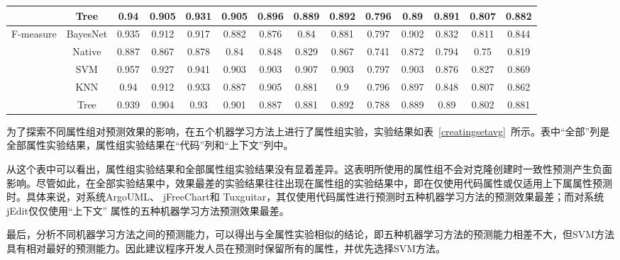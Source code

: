 \begin{sidewaystable} [htbp]
\begin{tabular}{cccccccccccccc}
&Tree&	0.94&	0.905&	0.931&		0.905&	0.896&	0.889&		0.892&	0.796&	0.89&		0.891&	0.807&	0.882\\
\hline
\multirow{5}{*}{F-measure}
&BayesNet&	0.935&	0.912&	0.917&		0.882&	0.876&	0.84&		0.881&	0.797&	0.902&		0.832&	0.811&	0.844\\
&Native&	0.887&	0.867&	0.878&		0.84&	0.848&	0.829&		0.867&	0.741&	0.872&		0.794&	0.75&	0.819\\
&SVM&	0.957&	0.927&	0.941&		0.903&	0.903&	0.907&		0.903&	0.797&	0.903&		0.876&	0.827&	0.869\\
&KNN&	0.94&	0.912&	0.933&		0.887&	0.905&	0.881&		0.9&	0.796&	0.897&		0.848&	0.807&	0.862\\
&Tree&	0.939&	0.904&	0.93&		0.901&	0.887&	0.881&		0.892&	0.788&	0.889&		0.89&	0.802&	0.881\\
\bottomrule[1.5pt]
\end{tabular}
\end{sidewaystable} 


为了探索不同属性组对预测效果的影响，在五个机器学习方法上进行了属性组实验，实验结果如表~\ref{creatingsetavg}~所示。表中“全部”列是全部属性实验结果，属性组实验结果在“代码”列和“上下文”列中。

从这个表中可以看出，属性组实验结果和全部属性组实验结果没有显着差异。这表明所使用的属性组不会对克隆创建时一致性预测产生负面影响。尽管如此，在全部实验结果中，效果最差的实验结果往往出现在属性组的实验结果中，即在仅使用代码属性或仅适用上下属属性预测时。具体来说，对系统ArgoUML、 jFreeChart和 Tuxguitar，其仅使用代码属性进行预测时五种机器学习方法的预测效果最差；而对系统jEdit仅仅使用“上下文” 属性的五种机器学习方法预测效果最差。

最后，分析不同机器学习方法之间的预测能力，可以得出与全属性实验相似的结论，即五种机器学习方法的预测能力相差不大，但SVM方法具有相对最好的预测能力。因此建议程序开发人员在预测时保留所有的属性，并优先选择SVM方法。


